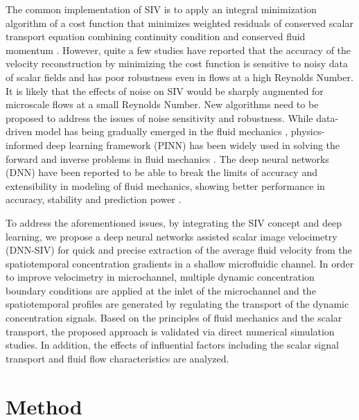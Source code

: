 \documentclass{article}
\begin{document}
The common implementation of SIV is to apply an integral minimization algorithm of a cost function that minimizes weighted residuals of conserved scalar transport equation combining continuity condition and conserved fluid momentum \citep{heitz2010variational,papadakis2008variational}. However, quite a few studies have reported \citep{burman2020stability} that the accuracy of the velocity reconstruction by minimizing the cost function is sensitive to noisy data of scalar fields and has poor robustness even in flows at a high Reynolds Number. It is likely that the effects of noise on SIV would be sharply augmented for microscale flows at a small Reynolds Number. New algorithms need to be proposed to address the issues of noise sensitivity and robustness. While data-driven model has being gradually emerged in the fluid mechanics \citep{kou2021data,bezgin2021data}, physics-informed deep learning framework (PINN) has been widely used in solving the forward and inverse problems in fluid mechanics \citep{chen2021learning,raissi2020hidden,raissi2019physics}. The deep neural networks (DNN) have been reported to be able to break the limits of accuracy and extensibility in modeling of fluid mechanics, showing better performance in accuracy, stability and prediction power \citep{barwey2019using,cai2021artificial}.\par
To address the aforementioned issues, by integrating the SIV concept and deep learning, we propose a deep neural networks assisted scalar image velocimetry (DNN-SIV) for quick and precise extraction of the average fluid velocity from the spatiotemporal concentration gradients in a shallow microfluidic channel. In order to improve velocimetry in microchannel, multiple dynamic concentration boundary conditions are applied at the inlet of the microchannel and the spatiotemporal profiles are generated by regulating the transport of the dynamic concentration signals. Based on the principles of fluid mechanics and the scalar transport, the proposed approach is validated via direct numerical simulation studies. In addition, the effects of influential factors including the scalar signal transport and fluid flow characteristics are analyzed.

\section{Method}
\end{document}
